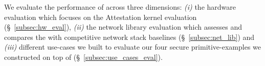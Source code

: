 







We evaluate the performance of \projecttitle{} across three dimensions: {\em (i)} the hardware evaluation which focuses on the Attestation kernel evaluation (\S~\ref{subsec:hw_eval}), {\em (ii)} the network library evaluation which assesses and compares the \projecttitle{} with competitive network stack baselines (\S~\ref{subsec:net_lib}) and {\em (iii)} different use-cases we built to evaluate our four secure primitive-examples we constructed on top of \projecttitle{} (\S~\ref{subsec:use_cases_eval}). 





